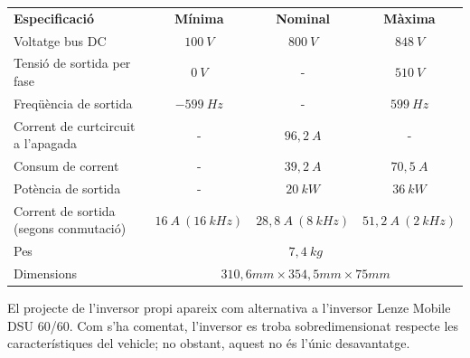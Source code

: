 {{\begin{table}[!htb]
            \begin{tabular}{|m{4cm}|c|c|c|}
                \hline
                    \textbf{ Especificació } & 
                    \textbf{ Mínima } &
                    \textbf{ Nominal } &
                    \textbf{ Màxima } \\
                \hhline{|=|=|=|=|}
                    { Voltatge bus DC } &
                    { $100\ V$ } &
                    { $800\ V$ } &
                    { $848\ V$ } \\
                \hline
                    { Tensió de sortida per fase } & 
                    { $0\ V$ } &
                    { - } & 
                    { $510\ V$ } \\
                \hline
                    { Freqüència de sortida } & 
                    { $-599\ Hz$ } & 
                    { - } & 
                    { $599\ Hz$ } \\
                \hline
                    { Corrent de curtcircuit a l'apagada } & 
                    { - } & 
                    { $96,2\ A$ } &
                    { - } \\
                \hline
                    { Consum de corrent } & 
                    { - } & 
                    { $39,2\ A$ } & 
                    { $70,5\ A$ } \\
                \hline
                    { Potència de sortida } & 
                    { - } & 
                    { $20\ kW$ } & 
                    { $36\ kW$ } \\
                \hline
                    { Corrent de sortida (segons conmutació) } & 
                    { $16\ A\ (16\ kHz)$ } & 
                    { $28,8\ A\ (8\ kHz)$ } &                    
                    { $51,2\ A\ (2\ kHz)$ } \\
                \hhline{|=|=|=|=|}
                    { Pes } & 
                    \multicolumn{3}{|c|}{ $7,4\ kg$ } \\
                \hline
                    { Dimensions } & 
                    \multicolumn{3}{|c|}{ $310,6 mm \times 354,5 mm \times 75 mm$ } \\
                \hline
            \end{tabular}
        \end{table}

        El projecte de l'inversor propi apareix com alternativa a l'inversor
        Lenze Mobile DSU 60/60. Com s'ha comentat, l'inversor es troba
        sobredimensionat respecte les característiques del vehicle; no obstant,
        aquest no és l'únic desavantatge. 
        
}}
